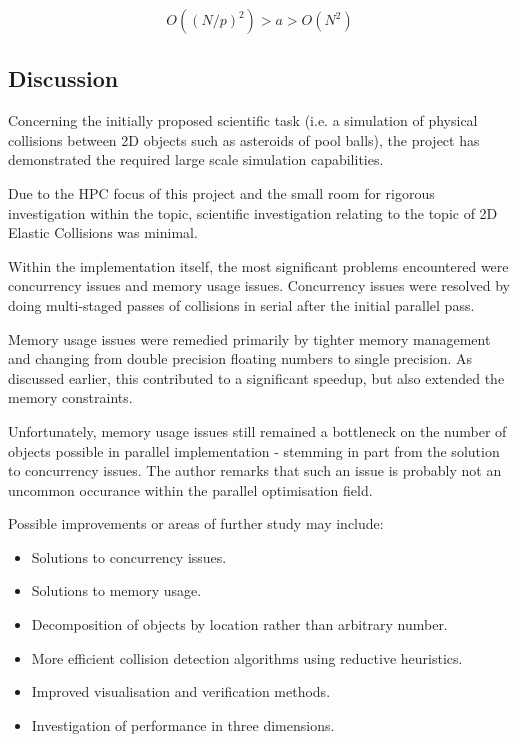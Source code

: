 \documentclass[twoside,twocolumn]{article}
\begin{document}
	\begin{equation}
		O((N/p)^2) > a > O(N^2)
	\end{equation}
	
	\subsection{Discussion}
		
	Concerning the initially proposed scientific task (i.e. a simulation of physical collisions between 2D objects such as asteroids of pool balls), the project has demonstrated the required large scale simulation capabilities. \newline
	
	Due to the HPC focus of this project and the small room for rigorous investigation within the topic, scientific investigation relating to the topic of 2D Elastic Collisions was minimal. \newline
	
	Within the implementation itself, the most significant  problems encountered were concurrency issues and memory usage issues. Concurrency issues were resolved by doing multi-staged passes of collisions in serial after the initial parallel pass. \newline
	
	Memory usage issues were remedied primarily by tighter memory management and changing from double precision floating numbers to single precision. As discussed earlier, this contributed to a significant speedup, but also extended the memory constraints. \newline
	
	Unfortunately, memory usage issues still remained a bottleneck on the number of objects possible in parallel implementation - stemming in part from the solution to concurrency issues. The author remarks that such an issue is probably not an uncommon occurance within the parallel optimisation field. \newline
	
	Possible improvements or areas of further study may include:
		\begin{itemize}
			\item Solutions to concurrency issues.
			\item Solutions to memory usage.
			\item Decomposition of objects by location rather than arbitrary number.
			\item More efficient collision detection algorithms using reductive heuristics.
			\item Improved visualisation and verification methods.
			\item Investigation of performance in three dimensions.
		\end{itemize}
	
\end{document}
